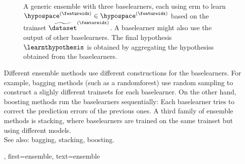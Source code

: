 {{\begin{figure}[htbp]
\begin{center}
			\caption{A generic ensemble with three \glspl{baselearner}, each  
				using \gls{erm} to learn $\hypospace^{(\featureidx)} \in \hypospace^{(\featureidx)}$ 
				based on the \gls{trainset} $\widetilde{\dataset}^{(\featureidx)}$. A \gls{baselearner} might also 
				use the output of other \glspl{baselearner}. The final \gls{hypothesis} $\learnthypothesis$ 
				is obtained by aggregating the \glspl{hypothesis} obtained from the \glspl{baselearner}.}
		\end{center}
	\end{figure}
		Different ensemble methods use different constructions for the \glspl{baselearner}. 
		For example, \gls{bagging} methods (such as a \gls{randomforest}) use random sampling to 
		construct a slighly different \glspl{trainset} for each \gls{baselearner}. 
	    On the other hand, \gls{boosting} methods run the \glspl{baselearner} 
		sequentially: Each \gls{baselearner} tries to correct the \gls{prediction} 
		errors of the previous ones. A third family of ensemble methods is \gls{stacking}, 
		where \glspl{baselearner} are trained on the same \gls{trainset} but using 
		different \glspl{model}.
		\\
	 	See also: \gls{bagging}, \gls{stacking}, \gls{boosting}.},
	 first={ensemble},
	 text={ensemble} 
}

